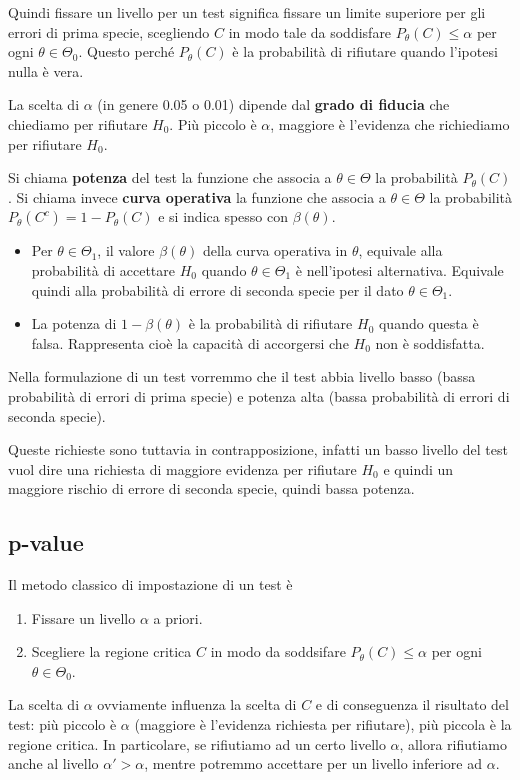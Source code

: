 Quindi fissare un livello per un test significa fissare un limite superiore per gli errori di
prima specie, scegliendo $C$ in modo tale da soddisfare $P_\theta (C) \leq \alpha$ per ogni
$\theta \in \Theta_0$. Questo perché $P_\theta(C)$ è la probabilità di rifiutare quando l'ipotesi
nulla è vera.

La scelta di $\alpha$ (in genere 0.05 o 0.01) dipende dal \textbf{grado di fiducia} che chiediamo
per rifiutare $H_0$. Più piccolo è $\alpha$, maggiore è l'evidenza che richiediamo per rifiutare
$H_0$.

\begin{definition}
	Si chiama \textbf{potenza} del test la funzione che associa a $\theta \in \Theta$ la
	probabilità $P_\theta(C)$. Si chiama invece \textbf{curva operativa} la funzione che associa
	a $\theta \in \Theta$ la probabilità $P_\theta (C^c) = 1 - P_\theta(C)$ e si indica spesso con
	$\beta(\theta)$.
	\begin{itemize}
		\item Per $\theta \in \Theta_1$, il valore $\beta(\theta)$ della curva operativa in
		      $\theta$, equivale alla probabilità di accettare $H_0$ quando $\theta \in \Theta_1$
		      è nell'ipotesi alternativa. Equivale quindi alla probabilità di errore di seconda
		      specie per il dato $\theta \in \Theta_1$.
		\item La potenza di $1 - \beta(\theta)$ è la probabilità di rifiutare $H_0$ quando questa
		      è falsa. Rappresenta cioè la capacità di accorgersi che $H_0$ non è soddisfatta.
	\end{itemize}
\end{definition}

Nella formulazione di un test vorremmo che il test abbia livello basso (bassa probabilità di errori
di prima specie) e potenza alta (bassa probabilità di errori di seconda specie).

Queste richieste sono tuttavia in contrapposizione, infatti un basso livello del test vuol dire una
richiesta di maggiore evidenza per rifiutare $H_0$ e quindi un maggiore rischio di errore di
seconda specie, quindi bassa potenza.

\subsection{p-value}
Il metodo classico di impostazione di un test è
\begin{enumerate}
	\item Fissare un livello $\alpha$ a priori.
	\item Scegliere la regione critica $C$ in modo da soddsifare $P_\theta(C) \leq \alpha$ per ogni
	      $\theta \in \Theta_0$.
\end{enumerate}
La scelta di $\alpha$ ovviamente influenza la scelta di $C$ e di conseguenza il risultato del test:
più piccolo è $\alpha$ (maggiore è l'evidenza richiesta per rifiutare), più piccola è la regione
critica. In particolare, se rifiutiamo ad un certo livello $\alpha$, allora rifiutiamo anche al
livello $\alpha' > \alpha$, mentre potremmo accettare per un livello inferiore ad $\alpha$.

